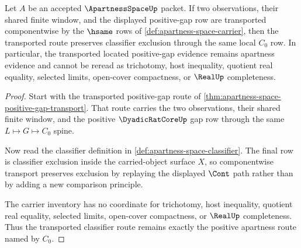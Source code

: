 \begin{theorem}
\label{thm:apartnessspace-apartness-classifier-stability}
Let $A$ be an accepted $\ApartnessSpaceUp$ packet. If two observations,
their shared finite window, and the displayed positive-gap row are transported
componentwise by the $\hsame$ rows of
\autoref{def:apartness-space-carrier}, then the transported route preserves
classifier exclusion through the same local $C_0$ row. In particular, the
transported located positive-gap evidence remains apartness evidence and
cannot be reread as trichotomy, host inequality, quotient real equality,
selected limits, open-cover compactness, or $\RealUp$ completeness.
\end{theorem}
\begin{proof}
Start with the transported positive-gap route of
\autoref{thm:apartness-space-positive-gap-transport}. That route carries the
two observations, their shared finite window, and the positive
$\DyadicRatCoreUp$ gap row through the same $L\longmapsto G\longmapsto C_0$
spine.

Now read the classifier definition in
\autoref{def:apartness-space-classifier}. The final row is classifier
exclusion inside the carried-object surface $X$, so componentwise transport
preserves exclusion by replaying the displayed $\Cont$ path rather than by
adding a new comparison principle.

The carrier inventory has no coordinate for trichotomy, host inequality,
quotient real equality, selected limits, open-cover compactness, or
$\RealUp$ completeness. Thus the transported classifier route remains exactly
the positive apartness route named by $C_0$.
\end{proof}

